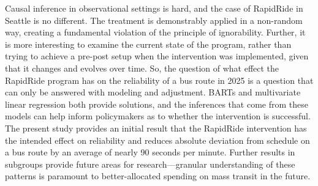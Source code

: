 \documentclass[
  12pt,
]{article}
\begin{document}
Causal inference in observational settings is hard, and the case of
RapidRide in Seattle is no different. The treatment is demonstrably
applied in a non-random way, creating a fundamental violation of the
principle of ignorability. Further, it is more interesting to examine
the current state of the program, rather than trying to achieve a
pre-post setup when the intervention was implemented, given that it
changes and evolves over time. So, the question of what effect the
RapidRide program has on the reliability of a bus route in 2025 is a
question that can only be answered with modeling and adjustment. BARTs
and multivariate linear regression both provide solutions, and the
inferences that come from these models can help inform policymakers as
to whether the intervention is successful. The present study provides an
initial result that the RapidRide intervention has the intended effect
on reliability and reduces absolute deviation from schedule on a bus
route by an average of nearly 90 seconds per minute. Further results in
subgroups provide future areas for research---granular understanding of
these patterns is paramount to better-allocated spending on mass transit
in the future.
\end{document}
